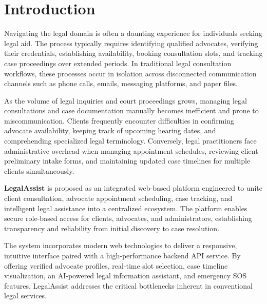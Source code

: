 \chapter{Introduction}

Navigating the legal domain is often a daunting experience for individuals seeking legal aid. The process typically requires identifying qualified advocates, verifying their credentials, establishing availability, booking consultation slots, and tracking case proceedings over extended periods. In traditional legal consultation workflows, these processes occur in isolation across disconnected communication channels such as phone calls, emails, messaging platforms, and paper files.

As the volume of legal inquiries and court proceedings grows, managing legal consultations and case documentation manually becomes inefficient and prone to miscommunication. Clients frequently encounter difficulties in confirming advocate availability, keeping track of upcoming hearing dates, and comprehending specialized legal terminology. Conversely, legal practitioners face administrative overhead when managing appointment schedules, reviewing client preliminary intake forms, and maintaining updated case timelines for multiple clients simultaneously.

\textbf{LegalAssist} is proposed as an integrated web-based platform engineered to unite client consultation, advocate appointment scheduling, case tracking, and intelligent legal assistance into a centralized ecosystem. The platform enables secure role-based access for clients, advocates, and administrators, establishing transparency and reliability from initial discovery to case resolution.

The system incorporates modern web technologies to deliver a responsive, intuitive interface paired with a high-performance backend API service. By offering verified advocate profiles, real-time slot selection, case timeline visualization, an AI-powered legal information assistant, and emergency SOS features, LegalAssist addresses the critical bottlenecks inherent in conventional legal services.

